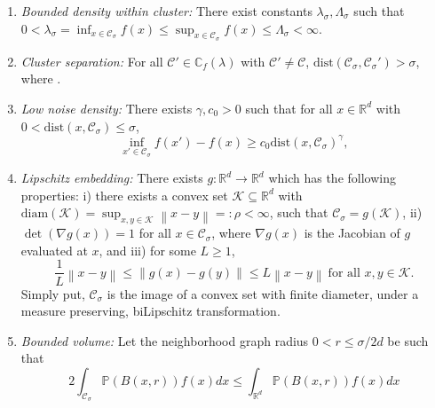 \documentclass{article}
\newcommand{\diam}{\rho}
\newcommand{\Reals}{\mathbb{R}}
\newcommand{\Rd}{\Reals^d}
\newcommand{\norm}[1]{\left\lVert#1\right\rVert}
\newcommand{\1}{\mathbf{1}}
\newcommand{\dist}{\mathrm{dist}}
\newcommand{\Pbb}{\mathbb{P}}
\newcommand{\Cbb}{\mathbb{C}}
\newcommand{\Cset}{\mathcal{C}}
\newcommand{\Csig}{\Cset_{\sigma}}
\theoremstyle{aldenthm}
\theoremstyle{aldenrmrk}
\begin{document}
\begin{enumerate}[label=(A\arabic*)]
	\item
	\label{asmp: bounded_density}
	\emph{Bounded density within cluster:} There exist constants $\lambda_{\sigma}, \Lambda_{\sigma}$ such that $0 < \lambda_{\sigma} = \inf_{x \in \Csig} f(x) \leq \sup_{x \in \Csig} f(x) \leq \Lambda_{\sigma} < \infty$.
	
	\item
	\label{asmp: cluster_separation}
	\emph{Cluster separation:}
	For all $\Cset' \in \Cbb_f(\lambda)$ with $\Cset' \not= \Cset$, $\dist(\Csig,\Csig') > \sigma$,
	where \smash{$\dist(\Csig,\Csig') := \inf_{x \in \Csig} \dist(x,\Csig')$}. 
	
	\item 
	\label{asmp: low_noise_density}
	\emph{Low noise density:} There exists $\gamma,c_0 > 0$ such that for all $x
	\in \Rd$ with $0 < \dist(x, \Csig) \leq \sigma$,   
	$$
	\inf_{x' \in \Csig} f(x') - f(x) \geq  c_0 \dist(x, \Csig)^{\gamma},
	$$ 
	
	\item
	\label{asmp: embedding}
	\emph{Lipschitz embedding:}
	There exists $g: \Reals^d \to \Reals^d$ which has the following properties: i) there exists a convex set $\mathcal{K} \subseteq \Rd$ with $\mathrm{diam}(\mathcal{K}) = \sup_{x,y \in \mathcal{K}}\norm{x - y} =: \diam < \infty$, such that $\Csig = g(\mathcal{K})$, ii) $\det(\nabla g (x)) = 1$ for all $x \in \Csig$, where $\nabla g(x)$ is the Jacobian of $g$ evaluated at $x$, and iii) for some $L \geq 1$, 
	\begin{equation*}
	\frac{1}{L}\norm{x - y} \leq \norm{g(x) - g(y)} \leq L \norm{x - y} ~ \text{for all $x,y \in \mathcal{K}$}.
	\end{equation*}
	Simply put, $\Csig$ is the image of a convex set with finite diameter, under a  measure preserving, biLipschitz transformation.
	\item
	\label{asmp: bounded_volume}
	\emph{Bounded volume:}
	Let the neighborhood graph radius $0 < r \leq \sigma/2d$ be such that
	\begin{equation*}
	2 \int_{\Csig} \Pbb(B(x,r)) f(x) dx \leq \int_{\Rd} \Pbb(B(x,r)) f(x) dx
	\end{equation*}
\end{enumerate}
\end{document}
